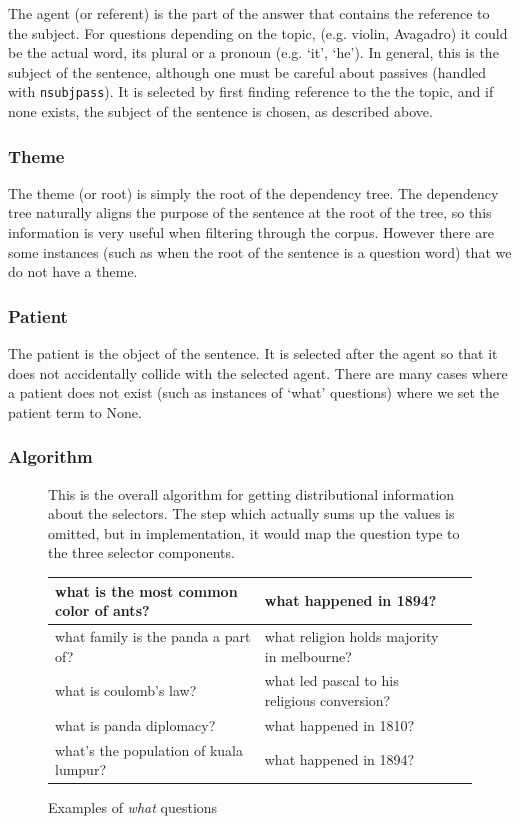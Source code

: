 \documentclass[twoside]{article}
\begin{document}
The agent (or referent) is the part of the answer that contains the reference to the subject.  For questions depending on the topic, (e.g. violin, Avagadro) it could be the actual word, its plural or a pronoun (e.g. `it', `he').  In general, this is the subject of the sentence, although one must be careful about passives (handled with \texttt{nsubjpass}).  It is selected by first finding reference to the the topic, and if none exists, the subject of the sentence is chosen, as described above.

\subsubsection{Theme}

The theme (or root) is simply the root of the dependency tree.  The dependency tree naturally aligns the purpose of the sentence at the root of the tree, so this information is very useful when filtering through the corpus.  However there are some instances (such as when the root of the sentence is a question word) that we do not have a theme.

\subsubsection{Patient}

The patient is the object of the sentence.  It is selected after the agent so that it does not accidentally collide with the selected agent.  There are many cases where a patient does not exist (such as instances of `what' questions) where we set the patient term to None.

\subsubsection{Algorithm}

\begin{figure}
\caption{This is the overall algorithm for getting distributional information about the selectors.  The step which actually sums up the values is omitted, but in implementation, it would map the question type to the three selector components. \label{fig:alg2}}

\end{figure}

\begin{figure}
\caption{Examples of \textit{what} questions \label{fig:whatqs}}
\begin{tabular}{|l|l|l|}
\hline
what is the most common color of ants? & what happened in 1894? \\ \hline
what family is the panda a part of? & what religion holds majority in melbourne? \\ \hline
what is coulomb's law? & what led pascal to his religious conversion? \\ \hline
what is panda diplomacy? & what happened in 1810? \\ \hline
what's the population of kuala lumpur? & what happened in 1894? \\ \hline
\end{tabular}
\end{figure}
\end{document}
